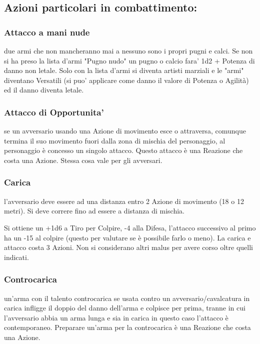 \documentclass[a4paper,11pt,twoside,openany]{book}
\begin{document}
\subsection{Azioni particolari in combattimento:} \label{sec:Azioni particolari in combattimento}

\subsubsection{Attacco a mani nude}   due armi che non mancheranno mai a nessuno sono i propri pugni e calci.
Se non si ha preso la lista d'armi "Pugno nudo" un pugno o calcio fara' 1d2 + Potenza di danno non letale.
Solo con la lista d'armi si diventa artisti marziali e le "armi" diventano Versatili (si puo' applicare come danno il valore di Potenza o Agilità) ed il danno diventa letale.

\subsubsection{Attacco di Opportunita'} se un avversario usando una Azione di movimento esce o attraversa, comunque termina il suo movimento fuori dalla zona di mischia del personaggio, al personaggio è concesso un singolo attacco. Questo attacco è una Reazione che costa una Azione. Stessa cosa vale per gli avversari.

\subsubsection{Carica} l'avversario deve essere ad una distanza entro 2 Azione di movimento (18 o 12 metri). Si deve correre fino ad essere a distanza di mischia.

Si ottiene un +1d6 a Tiro per Colpire, -4 alla Difesa, l'attacco successivo al primo ha un -15 al colpire (questo per valutare se è possibile farlo o meno). La carica e attacco costa 3 Azioni. Non si considerano altri malus per avere corso oltre quelli indicati.

\subsubsection{Controcarica} un'arma con il talento controcarica se usata contro un avversario/cavalcatura in carica infligge il doppio del danno dell'arma e colpisce per prima, tranne in cui l'avversario abbia un arma lunga e sia in carica in questo caso l'attacco è contemporaneo. Preparare un'arma per la controcarica è una Reazione che costa una Azione.
\end{document}
